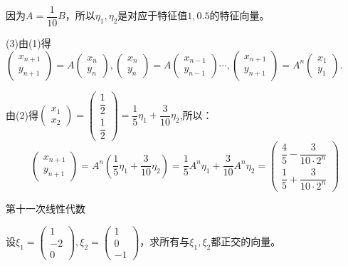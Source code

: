 \documentclass[a4paper]{report}
\begin{document}
\begin{jie}
因为$A=\dfrac{1}{10}B$，所以$\eta_1,\eta_2$是对应于特征值$1,0.5$的特征向量。

(3)由(1)得$
\begin{pmatrix}
x_{n+1}\\ y_{n+1}
\end{pmatrix}=A
\begin{pmatrix}
x_n\\ y_n
\end{pmatrix}
,\begin{pmatrix}
x_n\\ y_n
\end{pmatrix}
=A\begin{pmatrix}
x_{n-1}\\ y_{n-1}
\end{pmatrix}\cdots,\begin{pmatrix}
x_{n+1}\\ y_{n+1}
\end{pmatrix}=A^n
\begin{pmatrix}
x_1\\ y_1
\end{pmatrix}$.

由(2)得$
\begin{pmatrix}
 x_1\\ x_2
\end{pmatrix}=\begin{pmatrix}
               \dfrac{1}{2}\\[4pt]\dfrac{1}{2}
              \end{pmatrix}=\dfrac{1}{5}\eta_1+\dfrac{3}{10}\eta_2
$,所以：
\begin{equation*}
\begin{pmatrix}
x_{n+1}\\ y_{n+1}
\end{pmatrix}=A^n\left(\dfrac{1}{5}\eta_1+\dfrac{3}{10}\eta_2\right)=\dfrac{1}{5}A^{n}\eta_1+\dfrac{3}{10}A^{n}\eta_2=
\begin{pmatrix}
\dfrac{4}{5}-\dfrac{3}{10\cdot 2^n}\\[4pt]\dfrac{1}{5}+\dfrac{3}{10\cdot 2^n}
\end{pmatrix}
\end{equation*}
\end{jie}

\clearpage
\hphantom{~~}\hfill {\heiti 第十一次线性代数} \hfill\hphantom{~~}

\hphantom{~~}

\EX 设$\xi_1=
\begin{pmatrix}
1\\ -2\\0
\end{pmatrix},\xi_2=
\begin{pmatrix}
1\\ 0\\-1
\end{pmatrix}
$，求所有与$\xi_1,\xi_2$都正交的向量。
\end{document}
